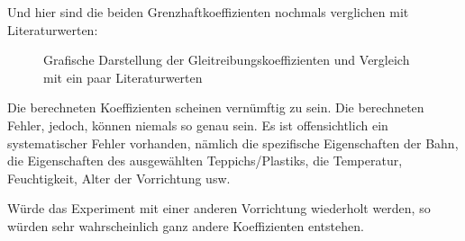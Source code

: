 Und  hier  sind   die  beiden  Grenzhaftkoeffizienten  nochmals  verglichen  mit
Literaturwerten\cite{ref:reibwerte}:

\begin{figure}[ht!]
    \centering
    \caption{Grafische Darstellung der Gleitreibungskoeffizienten und Vergleich mit ein paar Literaturwerten}
    \label{fig:grenzhaftkraft}
\end{figure}

Die  berechneten Koeffizienten scheinen vern\"umftig zu  sein.  Die  berechneten
Fehler,  jedoch,  k\"onnen  niemals so genau sein.  Es  ist  offensichtlich  ein
systematischer  Fehler  vorhanden,  n\"amlich die spezifische Eigenschaften  der
Bahn, die Eigenschaften des ausgew\"ahlten  Teppichs/Plastiks,  die  Temperatur,
Feuchtigkeit, Alter der Vorrichtung usw.

W\"urde  das  Experiment  mit  einer anderen Vorrichtung wiederholt  werden,  so
w\"urden    sehr    wahrscheinlich   ganz   andere   Koeffizienten    entstehen.


